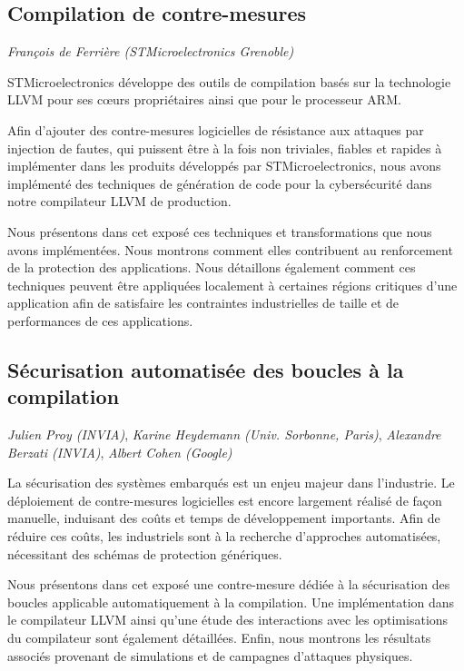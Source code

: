 \documentclass[a4paper,11pt]{article}
\begin{document}
\subsection{Compilation de contre-mesures}
\label{sec:org0ff8a16}
\emph{François de Ferrière (STMicroelectronics Grenoble)}

STMicroelectronics développe des outils de compilation basés sur la
technologie LLVM pour ses cœurs propriétaires ainsi que pour le
processeur ARM.

Afin d'ajouter des contre-mesures logicielles de résistance aux attaques
par injection de fautes, qui puissent être à la fois non triviales,
fiables et rapides à implémenter dans les produits développés par
STMicroelectronics, nous avons implémenté des techniques de génération
de code pour la cybersécurité dans notre compilateur LLVM de production.

Nous présentons dans cet exposé ces techniques et transformations que
nous avons implémentées. Nous montrons comment elles contribuent au
renforcement de la protection des applications. Nous détaillons
également comment ces techniques peuvent être appliquées localement à
certaines régions critiques d'une application afin de satisfaire les
contraintes industrielles de taille et de performances de ces applications.

\subsection{Sécurisation automatisée des boucles à la compilation}
\label{sec:org0394842}
\emph{Julien Proy (INVIA)},
\emph{Karine Heydemann (Univ. Sorbonne, Paris)},
\emph{Alexandre Berzati (INVIA)},
\emph{Albert Cohen (Google)}

La sécurisation des systèmes embarqués est un enjeu majeur dans l'industrie.
Le déploiement de contre-mesures logicielles est encore largement réalisé de façon manuelle, induisant des coûts et temps de développement importants.
Afin de réduire ces coûts, les industriels sont à la recherche d'approches automatisées, nécessitant des schémas de protection génériques.

Nous présentons dans cet exposé une contre-mesure dédiée à la sécurisation des boucles applicable automatiquement à la compilation.
Une implémentation dans le compilateur LLVM ainsi qu'une étude des interactions avec les optimisations du compilateur sont également détaillées.
Enfin, nous montrons les résultats associés provenant de simulations et de campagnes d'attaques physiques.
\end{document}

